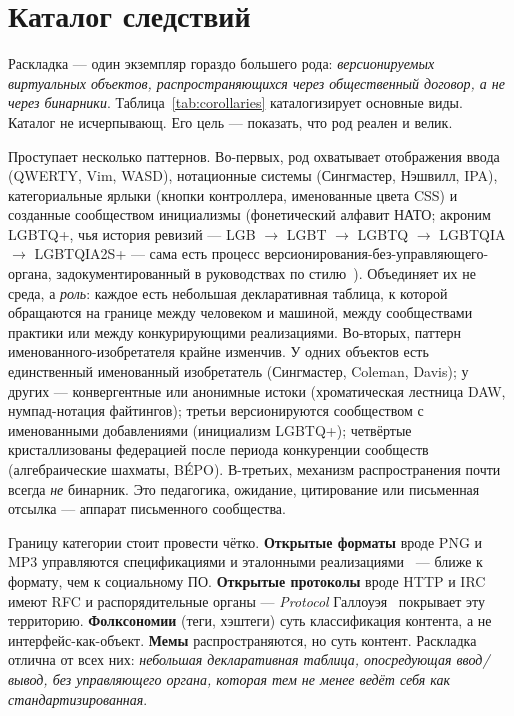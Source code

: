 \documentclass[10pt,letterpaper,twocolumn]{article}
\begin{document}
\section{Каталог следствий}
\label{sec:corollaries}

Раскладка --- один экземпляр гораздо большего рода: \emph{версионируемых виртуальных объектов, распространяющихся через общественный договор, а не через бинарники}. Таблица~\ref{tab:corollaries} каталогизирует основные виды. Каталог не исчерпывающ. Его цель --- показать, что род реален и велик.


Проступает несколько паттернов. Во-первых, род охватывает отображения ввода (QWERTY, Vim, WASD), нотационные системы (Сингмастер, Нэшвилл, IPA), категориальные ярлыки (кнопки контроллера, именованные цвета CSS) и созданные сообществом инициализмы (фонетический алфавит НАТО; акроним LGBTQ+, чья история ревизий --- LGB $\rightarrow$ LGBT $\rightarrow$ LGBTQ $\rightarrow$ LGBTQIA $\rightarrow$ LGBTQIA2S+ --- сама есть процесс версионирования-без-управляющего-органа, задокументированный в руководствах по стилю~\citep{glaad_reference_guide}). Объединяет их не среда, а \emph{роль}: каждое есть небольшая декларативная таблица, к которой обращаются на границе между человеком и машиной, между сообществами практики или между конкурирующими реализациями. Во-вторых, паттерн именованного-изобретателя крайне изменчив. У одних объектов есть единственный именованный изобретатель (Сингмастер, Coleman, Davis); у других --- конвергентные или анонимные истоки (хроматическая лестница DAW, нумпад-нотация файтингов); третьи версионируются сообществом с именованными добавлениями (инициализм LGBTQ+); четвёртые кристаллизованы федерацией после периода конкуренции сообществ (алгебраические шахматы, BÉPO). В-третьих, механизм распространения почти всегда \emph{не} бинарник. Это педагогика, ожидание, цитирование или письменная отсылка --- аппарат письменного сообщества.

Границу категории стоит провести чётко. \textbf{Открытые форматы} вроде PNG и MP3 управляются спецификациями и эталонными реализациями~\citep{sterne2012mp3} --- ближе к формату, чем к социальному ПО. \textbf{Открытые протоколы} вроде HTTP и IRC имеют RFC и распорядительные органы --- \emph{Protocol} Галлоуэя~\citep{galloway2004protocol} покрывает эту территорию. \textbf{Фолксономии} (теги, хэштеги) суть классификация контента, а не интерфейс-как-объект. \textbf{Мемы} распространяются, но суть контент. Раскладка отлична от всех них: \emph{небольшая декларативная таблица, опосредующая ввод/вывод, без управляющего органа, которая тем не менее ведёт себя как стандартизированная}.
\end{document}
